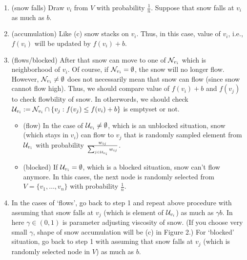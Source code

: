 \documentclass[preprint, review, 12pt]{article}
\theoremstyle{definition}
\theoremstyle{remark}
\begin{document}
\begin{enumerate}[1.]
\item (snow falls) Draw $v_i$ from $V$ with probability $\frac{1}{n}$. Suppose that snow falls at $v_i$ as much as $b$. 
\item (accumulation) Like (c) snow stacks on $v_i$. Thus, in this case, value of $v_i$, i.e., $f(v_i)$ will be updated by $f(v_i)+b$. 
\item (flows/blocked) After that snow can move to one of ${\cal N}_{v_i}$ which is neighborhood of $v_i$. Of course, if ${\cal N}_{v_i}=\emptyset$, the snow will no longer flow. However, ${\cal N}_{v_i}\neq \emptyset$ does not necessarily mean that snow can flow (since snow cannot flow high). Thus, we should compare value of $f(v_i)+b$ and $f(v_j)$ to check flowbility of snow. In otherwords, we should check ${\cal U}_{v_i}:={\cal N}_{v_i} \cap \{v_j: f(v_j) \leq f(v_i)+b\}$ is emptyset or not. 
\begin{itemize}
\item (flow) In the case of ${\cal U}_{v_i}\neq\emptyset$, which is an unblocked situation, snow (which stays in $v_i$) can flow to $v_j$ that is randomly sampled element from ${\cal U}_{v_i}$ with probability $\frac{w_{ij}}{\sum_{j \in {\cal U}_{v_i} }w_{ij} }$. 
\item (blocked) If ${\cal U}_{v_i}=\emptyset$, which is a blocked situation, snow can't flow anymore. In this cases, the next node is randomly selected from $V=\{v_1,\dots,v_n\}$ with probability $\frac{1}{n}$. 
\end{itemize}
\item In the cases of `flows', go back to step 1 and repeat above procedure with assuming that snow falls at $v_j$ (which is element of ${\cal U}_{v_i}$) as much as $\gamma b$. In here $\gamma \in (0,1)$ is parameter adjusting viscosity of snow. (If you choose very small $\gamma$, shape of snow accumulation will be (c) in Figure 2.) For `blocked' situation, go back to step 1 with assuming that snow falls at $v_j$ (which is randomly selected node in $V$) as much as $b$.
  
\end{enumerate}
\end{document}
